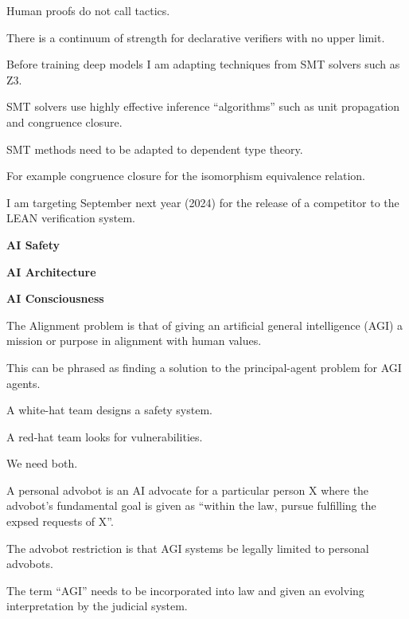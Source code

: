 {\vfill
Human proofs do not call tactics.


\vfill
There is a continuum of strength for declarative verifiers with no upper limit.


\vfill
Before training deep models I am adapting techniques from SMT solvers such as Z3.

\vfill
SMT solvers use highly effective inference ``algorithms'' such as unit propagation and congruence closure.

\vfill
SMT methods need to be adapted to dependent type theory.

\vfill
For example congruence closure for the isomorphism equivalence relation.


I am targeting September next year (2024) for the release of a competitor to the LEAN verification system.


\centerline{\bf AI Safety}

\vfill
\centerline{\bf AI Architecture}

\vfill
\centerline{\bf AI Consciousness}



The Alignment problem is that of giving an artificial general intelligence (AGI) a mission or purpose in alignment with human values.

\vfill
This can be phrased as finding a solution to the principal-agent problem for AGI agents.


A white-hat team designs a safety system.

\vfill
A red-hat team looks for vulnerabilities.

\vfill
We need both.


A personal advobot is an AI advocate for a particular person X where the advobot's fundamental goal is given as ``within the law, pursue fulfilling the expsed requests of X''.

\vfill
The advobot  restriction is that AGI systems be legally limited to personal advobots.

\vfill
The term ``AGI'' needs to be incorporated into law and given an evolving interpretation by the judicial system.


}

